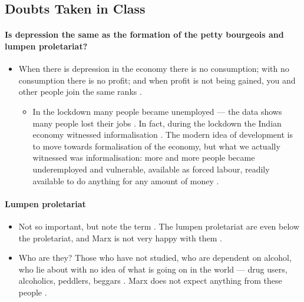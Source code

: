 \subsection{Doubts Taken in Class}

\paragraph{Is depression the same as the formation of the petty bourgeois and lumpen proletariat?}
\begin{itemize}
    \item When there is depression in the economy there is no consumption; with no consumption there is no profit; and when profit is not being gained, you and other people join the same ranks .
    \begin{itemize}
        \item In the lockdown many people became unemployed --- the data shows many people lost their jobs . In fact, during the lockdown the Indian economy witnessed informalisation . The modern idea of development is to move towards formalisation of the economy, but what we actually witnessed was informalisation: more and more people became underemployed and vulnerable, available as forced labour, readily available to do anything for any amount of money .
    \end{itemize}
\end{itemize}

\paragraph{Lumpen proletariat}
\begin{itemize}
    \item Not so important, but note the term . The lumpen proletariat are even below the proletariat, and Marx is not very happy with them .
    \item Who are they? Those who have not studied, who are dependent on alcohol, who lie about with no idea of what is going on in the world --- drug users, alcoholics, peddlers, beggars . Marx does not expect anything from these people .
\end{itemize}

